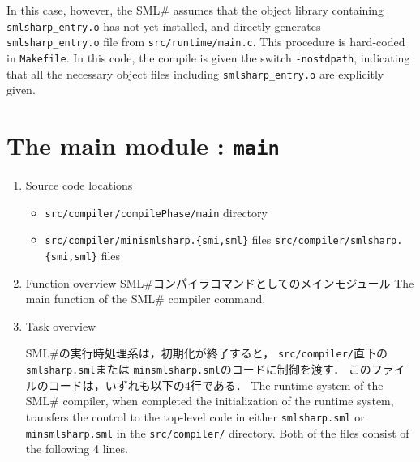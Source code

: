 \documentclass{jbook}
\newcommand{\txt}[2]{#2}
\newcommand{\smlsharp}{SML\#}
\newcommand{\code}[1]{\mbox{\large\tt #1}}
\begin{document}
	In this case, however, the \smlsharp{} assumes that the object
library containing \code{smlsharp\_entry.o} has not yet installed, 
and directly generates \code{smlsharp\_entry.o} file from 
\code{src/runtime/main.c}.
	This procedure is hard-coded in \code{Makefile}.
	In this code, the compile is given the switch \code{-nostdpath},
indicating that all the necessary object files including 
\code{smlsharp\_entry.o} are explicitly given.
\fi%

\chapter{\txt
{メインモジュール：\code{main}}
{The main module : \code{main}}
}
\label{chap:Main}

\begin{enumerate}
\item \txt{ソースロケーション}{Source code locations}
\begin{itemize}
\item \code{src/compiler/compilePhase/main} \txt{ディレクトリ}{directory}
\item \code{src/compiler/minismlsharp.\{smi,sml\}} \txt{ファイル}{files}
\code{src/compiler/smlsharp.\{smi,sml\}} \txt{ファイル}{files}
\end{itemize}


\item \txt{機能概要}{Function overview}
\ifjp%
	\smlsharp{}コンパイラコマンドとしてのメインモジュール
\else%
	The main function of the \smlsharp{} compiler command.
\fi%

\item \txt{処理概要}{Task overview}


\ifjp%
	\smlsharp{}の実行時処理系は，初期化が終了すると，
\code{src/compiler/}直下の\code{smlsharp.sml}または
\code{minsmlsharp.sml}のコードに制御を渡す．
	このファイルのコードは，いずれも以下の4行である．
\else%
	The runtime system of the \smlsharp{} compiler, when completed
the initialization of the runtime system, transfers the control to the
top-level code in either \code{smlsharp.sml} or \code{minsmlsharp.sml}
in the \code{src/compiler/} directory.
	Both of the files consist of the following 4 lines.
\fi%


\end{enumerate}
\end{document}
